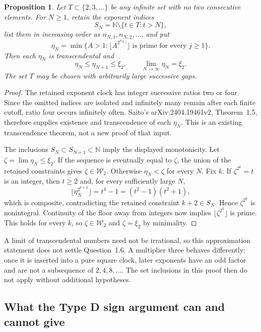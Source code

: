\documentclass[11pt,a4paper]{article}
\newtheorem{proposition}[theorem]{Proposition}
\theoremstyle{definition}
\theoremstyle{remark}
\numberwithin{equation}{section}
\begin{document}
\begin{proposition}\label{mil:sq-sparse-approx}
Let $T\subset\{2,3,\ldots\}$ be any infinite set with no two
consecutive elements. For $N\ge1$, retain the exponent indices
\[
 S_N=\mathbb N\setminus\{t\in T:t>N\},
\]
list them in increasing order as $n_{N,1},n_{N,2},\ldots$, and put
\[
 \eta_N=\min\{A>1:\lfloor A^{2^{n_{N,j}}}\rfloor
                     \text{ is prime for every }j\ge1\}.
\]
Then each $\eta_N$ is transcendental and
\[
 \eta_N\le\eta_{N+1}\le\xi_2,
 \qquad \lim_{N\to\infty}\eta_N=\xi_2.
\]
The set $T$ may be chosen with arbitrarily large successive gaps.
\end{proposition}
\begin{proof}
The retained exponent clock has integer successive ratios two
or four. Since the omitted indices are isolated and infinitely
many remain after each finite cutoff, ratio four occurs infinitely
often. Saito's arXiv:2404.19461v2, Theorem~1.5, therefore supplies
existence and transcendence of each $\eta_N$. This is an existing
transcendence theorem, not a new proof of that input.

The inclusions $S_N\subset S_{N+1}\subset\mathbb N$ imply the
displayed monotonicity. Let $\zeta=\lim\eta_N\le\xi_2$.
If the sequence is eventually equal to $\zeta$, the union of
the retained constraints gives $\zeta\in\mathcal W_2$. Otherwise
$\eta_N<\zeta$ for every $N$. Fix $k$. If $\zeta^{2^k}=t$ is
an integer, then $t\ge2$ and, for every sufficiently large $N$,
\[
 \lfloor\eta_N^{2^{k+2}}\rfloor=t^4-1
 =(t^2-1)(t^2+1),
\]
which is composite, contradicting the retained constraint
$k+2\in S_N$. Hence $\zeta^{2^k}$ is nonintegral. Continuity
of the floor away from integers now implies
$\lfloor\zeta^{2^k}\rfloor$ is prime. This holds for every $k$,
so $\zeta\in\mathcal W_2$ and $\zeta=\xi_2$ by minimality.
\end{proof}

A limit of transcendental numbers need not be irrational, so this
approximation statement does not settle Question~1.6. A multiplier
three behaves differently: once it is inserted into a pure square
clock, later exponents have an odd factor and are not a subsequence
of $2,4,8,\ldots$. The set inclusions in this proof then do not
apply without additional hypotheses.

\subsection{What the Type D sign argument can and cannot give}
\end{document}
